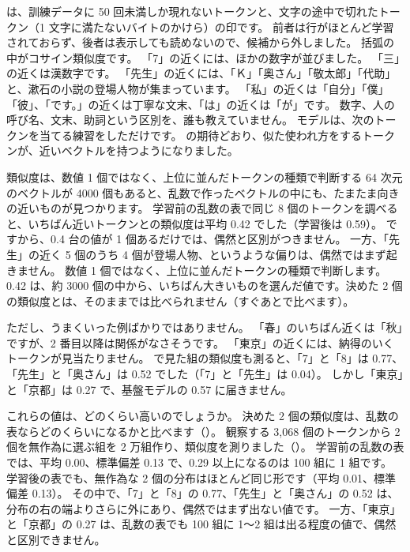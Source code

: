  は、訓練データに 50 回未満しか現れないトークンと、文字の途中で切れたトークン（1 文字に満たないバイトのかけら）の印です。
前者は行がほとんど学習されておらず、後者は表示しても読めないので、候補から外しました。
括弧の中がコサイン類似度です。
「7」の近くには、ほかの数字が並びました。
「三」の近くは漢数字です。
「先生」の近くには、「Ｋ」「奥さん」「敬太郎」「代助」と、漱石の小説の登場人物が集まっています。
「私」の近くは「自分」「僕」「彼」、「です。」の近くは丁寧な文末、「は」の近くは「が」です。
数字、人の呼び名、文末、助詞という区別を、誰も教えていません。
モデルは、次のトークンを当てる練習をしただけです。
の期待どおり、似た使われ方をするトークンが、近いベクトルを持つようになりました。

\begin{caution}{類似度は、数値 1 個ではなく、上位に並んだトークンの種類で判断する}
64 次元のベクトルが 4000 個もあると、乱数で作ったベクトルの中にも、たまたま向きの近いものが見つかります。
学習前の乱数の表で同じ 8 個のトークンを調べると、いちばん近いトークンとの類似度は平均 0.42 でした（学習後は 0.59）。
ですから、0.4 台の値が 1 個あるだけでは、偶然と区別がつきません。
一方、「先生」の近く 5 個のうち 4 個が登場人物、というような偏りは、偶然ではまず起きません。
数値 1 個ではなく、上位に並んだトークンの種類で判断します。
0.42 は、約 3000 個の中から、いちばん大きいものを選んだ値です。決めた 2 個の類似度とは、そのままでは比べられません（すぐあとで比べます）。
\end{caution}

ただし、うまくいった例ばかりではありません。
「春」のいちばん近くは「秋」ですが、2 番目以降は関係がなさそうです。
「東京」の近くには、納得のいくトークンが見当たりません。
で見た組の類似度も測ると、「7」と「8」は 0.77、「先生」と「奥さん」は 0.52 でした（「7」と「先生」は 0.04）。
しかし「東京」と「京都」は 0.27 で、基盤モデルの 0.57 に届きません。

これらの値は、どのくらい高いのでしょうか。
決めた 2 個の類似度は、乱数の表ならどのくらいになるかと比べます（）。
観察する 3,068 個のトークンから 2 個を無作為に選ぶ組を 2 万組作り、類似度を測りました（）。
学習前の乱数の表では、平均 0.00、標準偏差 0.13 で、0.29 以上になるのは 100 組に 1 組です。
学習後の表でも、無作為な 2 個の分布はほとんど同じ形です（平均 0.01、標準偏差 0.13）。
その中で、「7」と「8」の 0.77、「先生」と「奥さん」の 0.52 は、分布の右の端よりさらに外にあり、偶然ではまず出ない値です。
一方、「東京」と「京都」の 0.27 は、乱数の表でも 100 組に 1〜2 組は出る程度の値で、偶然と区別できません。

